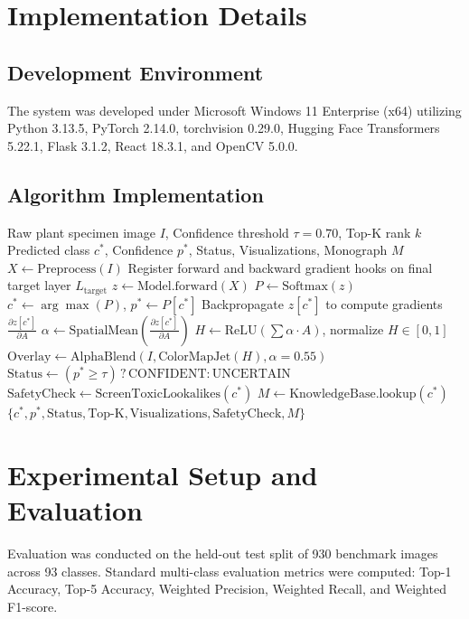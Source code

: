 \documentclass[sn-mathphys,Numbered]{sn-jnl}%
\begin{document}
\section{Implementation Details}\label{sec6}
\subsection{Development Environment}
The system was developed under Microsoft Windows 11 Enterprise (x64) utilizing Python 3.13.5, PyTorch 2.14.0, torchvision 0.29.0, Hugging Face Transformers 5.22.1, Flask 3.1.2, React 18.3.1, and OpenCV 5.0.0.

\subsection{Algorithm Implementation}
\begin{algorithm}[h]
\caption{Confidence-Aware Botanical Inference and Grad-CAM Attribution}\label{algo:infer}
\begin{algorithmic}[1]
\Require Raw plant specimen image $I$, Confidence threshold $\tau = 0.70$, Top-K rank $k$
\Ensure Predicted class $c^*$, Confidence $p^*$, Status, Visualizations, Monograph $M$
\State $X \gets \text{Preprocess}(I)$ 
\State Register forward and backward gradient hooks on final target layer $L_{\text{target}}$
\State $z \gets \text{Model.forward}(X)$
\State $P \gets \text{Softmax}(z)$
\State $c^* \gets \arg\max(P)$, $p^* \gets P[c^*]$
\State Backpropagate $z[c^*]$ to compute gradients $\frac{\partial z[c^*]}{\partial A}$
\State $\alpha \gets \text{SpatialMean}\left(\frac{\partial z[c^*]}{\partial A}\right)$
\State $H \gets \text{ReLU}\left(\sum \alpha \cdot A\right)$, normalize $H \in [0, 1]$
\State $\text{Overlay} \gets \text{AlphaBlend}(I, \text{ColorMapJet}(H), \alpha=0.55)$
\State $\text{Status} \gets (p^* \ge \tau) \mathrel{?} \text{CONFIDENT} : \text{UNCERTAIN}$
\State $\text{SafetyCheck} \gets \text{ScreenToxicLookalikes}(c^*)$
\State $M \gets \text{KnowledgeBase.lookup}(c^*)$
\State \Return $\{ c^*, p^*, \text{Status}, \text{Top-K}, \text{Visualizations}, \text{SafetyCheck}, M \}$
\end{algorithmic}
\end{algorithm}

\section{Experimental Setup and Evaluation}\label{sec7}
Evaluation was conducted on the held-out test split of 930 benchmark images across 93 classes. Standard multi-class evaluation metrics were computed: Top-1 Accuracy, Top-5 Accuracy, Weighted Precision, Weighted Recall, and Weighted F1-score.
\end{document}
